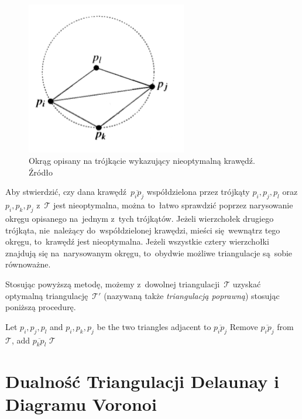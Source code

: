 \documentclass[skorowidz,autorrok,backref,xodstep,oswiadczenie]{wmimgr}
\begin{document}
\begin{figure}[ht!]
\centering
\includegraphics[width=70mm]{images/triangulacja3.png}
\caption{Okrąg opisany na trójkącie wykazujący nieoptymalną krawędź. Źródło \cite{geometria}}
\label{edgetest}
\end{figure}

Aby stwierdzić, czy dana krawędź~$\overline{p_{i} p_{j}}$ współdzielona przez trójkąty $p_{i}, p_{j}, p_{l}$ oraz $p_{i}, p_{k}, p_{j}$ z~$\mathcal{T}$ jest nieoptymalna, można to~łatwo sprawdzić poprzez narysowanie okręgu opisanego na~jednym z~tych trójkątów. Jeżeli wierzchołek drugiego trójkąta, nie~należący do~współdzielonej krawędzi, mieści się~wewnątrz tego okręgu, to~krawędź jest nieoptymalna. Jeżeli wszystkie cztery wierzchołki znajdują się na~narysowanym okręgu, to~obydwie możliwe triangulacje są~sobie równoważne.

Stosując powyższą metodę, możemy z~dowolnej triangulacji~$\mathcal{T}$ uzyskać optymalną triangulację~$\mathcal{T'}$ (nazywaną także \emph{triangulacją poprawną}) stosując poniższą procedurę.

\begin{algorithm}
\caption{$LegalTriangulation(\mathcal{T})$ \cite{geometria}}
\label{LegalTriangulation}
\begin{algorithmic}
        \STATE Let $p_{i}, p_{j}, p_{l}$ and $p_{i}, p_{k}, p_{j}$ be the two triangles adjacent to $\overline{p_{i} p_{j}}$
        \STATE Remove $\overline{p_{i} p_{j}}$ from $\mathcal{T}$, add $\overline{p_{k} p_{l}}$
    \ENDWHILE
    \RETURN $\mathcal{T}$
\end{algorithmic}
\end{algorithm}

\section{Dualność Triangulacji Delaunay i Diagramu Voronoi}
\end{document}
